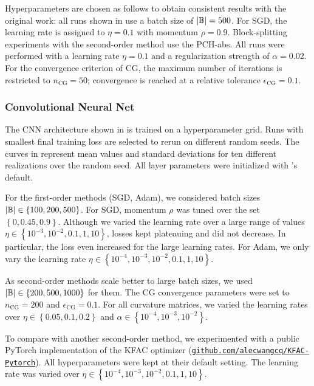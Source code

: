 Hyperparameters are chosen as follows to obtain consistent results with the
original work: all runs shown in  use a batch
size of $|{\mathbb{B}}| = 500$. For SGD, the learning rate is assigned to $\eta = 0.1$
with momentum $\rho=0.9$. Block-splitting experiments with the second-order
method use the PCH-abs. All runs were performed with a learning rate $\eta =
0.1$ and a regularization strength of $\alpha = 0.02$. For the convergence
criterion of CG, the maximum number of iterations is restricted to $n_\text{CG}
= 50$; convergence is reached at a relative tolerance $\epsilon_{\text{CG}} =
0.1$.

\subsubsection{Convolutional Neural Net}

The CNN architecture shown in  is
trained on a hyperparameter grid. Runs with smallest final training loss are
selected to rerun on different random seeds. The curves in
 represent mean values and standard deviations
for ten different realizations over the random seed. All layer parameters were
initialized with \pytorch's default.

For the first-order methods (SGD, Adam), we considered batch sizes $|{\mathbb{B}}| \in
\left\{100, 200, 500\right\}$. For SGD, momentum $\rho$ was tuned over the set
$\left\{0, 0.45, 0.9\right\}$. Although we varied the learning rate over a large
range of values $\eta \in \left\{ 10^{-3}, 10^{-2}, 0.1,1, 10 \right\}$, losses
kept plateauing and did not decrease. In particular, the loss even increased for
the large learning rates. For Adam, we only vary the learning rate $\eta \in
\left\{ 10^{-4}, 10^{-3}, 10^{-2}, 0.1,1, 10 \right\}$.

As second-order methods scale better to large batch sizes, we used $|{\mathbb{B}}| \in
\left\{200, 500, 1000\right\}$ for them. The CG convergence parameters were set
to $n_\text{CG} = 200$ and $\epsilon_{\text{CG}} = 0.1$. For all curvature
matrices, we varied the learning rates over $\eta \in \left\{ 0.05, 0.1,0.2
\right\}$ and $\alpha \in \left\{10^{-4}, 10^{-3}, 10^{-2} \right\}$.

To compare with another second-order method, we experimented with a public
PyTorch implementation of the KFAC optimizer
\citep{martens2015optimizing,grosse2016kronecker}
(\href{https://github.com/alecwangcq/KFAC-Pytorch}{\texttt{github.com/alecwangcq/KFAC-Pytorch}}).
All hyperparameters were kept at their default setting. The learning rate was
varied over $\eta \in \left\{ 10^{-4}, 10^{-3}, 10^{-2}, 0.1,1, 10 \right\}$.

